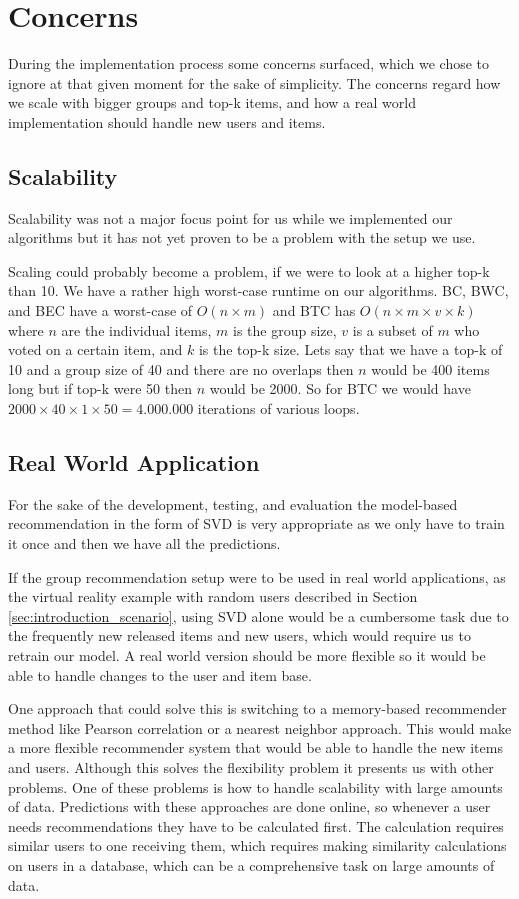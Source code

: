 \section{Concerns}
During the implementation process some concerns surfaced, which we chose to ignore at that given moment for the sake of simplicity. The concerns regard how we scale with bigger groups and top-k items, and how a real world implementation should handle new users and items.

\subsection{Scalability}
Scalability was not a major focus point for us while we implemented our algorithms but it has not yet proven to be a problem with the setup we use. 

Scaling could probably become a problem, if we were to look at a higher top-k than 10. We have a rather high worst-case runtime on our algorithms. BC, BWC, and BEC have a worst-case of $O(n\times m)$ and BTC has $O(n\times m\times v\times k)$ where $n$ are the individual items, $m$ is the group size, $v$ is a subset of $m$ who voted on a certain item, and $k$ is the top-k size. Lets say that we have a top-k of 10 and a group size of 40 and there are no overlaps then $n$ would be 400 items long but if top-k were 50 then $n$ would be 2000. So for BTC we would have $2000 \times 40 \times 1 \times 50 = 4.000.000$ iterations of various loops.

\subsection{Real World Application}
For the sake of the development, testing, and evaluation the model-based recommendation in the form of SVD is very appropriate as we only have to train it once and then we have all the predictions.

If the group recommendation setup were to be used in real world applications, as the virtual reality example with random users described in Section \ref{sec:introduction_scenario}, using SVD alone would be a cumbersome task due to the frequently new released items and new users, which would require us to retrain our model. A real world version should be more flexible so it would be able to handle changes to the user and item base. 

One approach that could solve this is switching to a memory-based recommender method like Pearson correlation or a nearest neighbor approach. This would make a more flexible recommender system that would be able to handle the new items and users. Although this solves the flexibility problem it presents us with other problems. One of these problems is how to handle scalability with large amounts of data\cite{DBLP:conf/adaptive/SchaferFHS07}. Predictions with these approaches are done online, so whenever a user needs recommendations they have to be calculated first. The calculation requires similar users to one receiving them, which requires making similarity calculations on users in a database, which can be a comprehensive task on large amounts of data.

